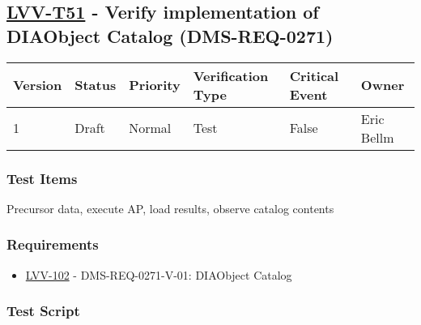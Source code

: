 \hypertarget{lvv-t51---verify-implementation-of-diaobject-catalog-dms-req-0271}{%
\subsection{\texorpdfstring{\href{https://jira.lsstcorp.org/secure/Tests.jspa\#/testCase/LVV-T51}{LVV-T51}
- Verify implementation of DIAObject Catalog
(DMS-REQ-0271)}{LVV-T51 - Verify implementation of DIAObject Catalog (DMS-REQ-0271)}}\label{lvv-t51---verify-implementation-of-diaobject-catalog-dms-req-0271}}

\begin{longtable}[]{@{}llllll@{}}
\toprule
Version & Status & Priority & Verification Type & Critical Event &
Owner\tabularnewline
\midrule
\endhead
1 & Draft & Normal & Test & False & Eric Bellm\tabularnewline
\bottomrule
\end{longtable}

\hypertarget{test-items-140}{%
\subsubsection{Test Items}\label{test-items-140}}

Precursor data, execute AP, load results, observe catalog contents

\hypertarget{requirements-141}{%
\subsubsection{Requirements}\label{requirements-141}}

\begin{itemize}
\tightlist
\item
  \href{https://jira.lsstcorp.org/browse/LVV-102}{LVV-102} -
  DMS-REQ-0271-V-01: DIAObject Catalog
\end{itemize}

\hypertarget{test-script-141}{%
\subsubsection{Test Script}\label{test-script-141}}

